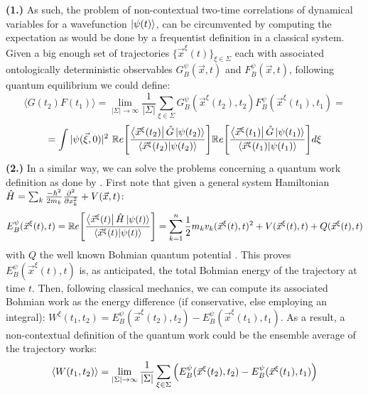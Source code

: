 \documentclass[11pt, a4paper]{article} %
\begin{document}
{\bf (1.)} As such, the problem of non-contextual two-time correlations of dynamical variables for a wavefunction $\ket{\psi(t)}$, can be circumvented by computing the expectation as would be done by a frequentist definition in a classical system. Given a big enough set of trajectories $\{\vec{x}^\xi(t)\}_{\xi\in \Sigma}$ each with associated ontologically deterministic observables $G_B^\psi(\vec{x},t)$ and $F_B^\psi(\vec{x},t)$, following quantum equilibrium \cite{Absolute} we could define:
\begin{equation}
\langle G(t_2)F(t_1)\rangle = \lim_{|\Sigma|\rightarrow \infty}\frac{1}{|\Sigma|} \sum_{\xi\in\Sigma} G_B^\psi(\vec{x}^\xi(t_2),t_2)F_B^\psi(\vec{x}^\xi(t_1),t_1) =
\end{equation}
$$
=  \int |\psi(\vec{\xi},0)|^2\ \mathbb{R}e\qty[ \frac{\bra{\vec{x}^\xi(t_2)}\hat{G}\ket{\psi(t_2)}}{\bra{\vec{x}^\xi(t_2)}\ket{\psi(t_2)}} ] \mathbb{R}e\qty[ \frac{\bra{\vec{x}^\xi(t_1)}\hat{G}\ket{\psi(t_1)}}{\bra{\vec{x}^\xi(t_1)}\ket{\psi(t_1)}} ]d\xi
$$
{\bf (2.) } In a similar way, we can solve the problems concerning a quantum work definition as done by \cite{work1, work2}. First note that given a general system Hamiltonian $\hat{H}=\sum_k \frac{-\hbar^2}{2m_k}\pdv[2]{}{x_k}+V(\vec{x},t)$:
\begin{equation}
E^\psi_B(\vec{x}^\xi(t),t) = \mathbb{R}e\qty[ \frac{\bra{\vec{x}^\xi(t)}\hat{H}\ket{\psi(t)}}{\bra{\vec{x}^\xi(t)}\ket{\psi(t)}} ] = \sum_{k=1}^n\frac{1}{2}m_kv_k(\vec{x}^\xi(t),t)^2+V(\vec{x}^\xi(t),t)+Q(\vec{x}^\xi(t),t)
\end{equation}
with $Q$ the well known Bohmian quantum potential \cite{Holland, Durr, JordiXavier}. This proves $E^\psi_B(\vec{x}^\xi(t),t)$ is, as anticipated, the total Bohmian energy of the trajectory at time $t$. Then, following classical mechanics, we can compute its associated Bohmian work as the energy difference (if conservative, else employing an integral): $W^\xi(t_1,t_2)= E^\psi_B(\vec{x}^\xi(t_2),t_2)-E^\psi_B(\vec{x}^\xi(t_1),t_1)$. As a result, a non-contextual definition of the quantum work could be the ensemble average of the trajectory works:
\begin{equation}
\langle W(t_1,t_2)\rangle = \lim_{|\Sigma|\rightarrow \infty}\frac{1}{|\Sigma|} \sum_{\xi\in\Sigma} \qty(E^\psi_B(\vec{x}^\xi(t_2),t_2)-E^\psi_B(\vec{x}^\xi(t_1),t_1))
\end{equation}
\end{document}
